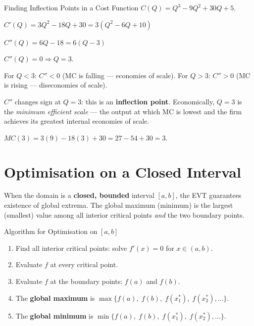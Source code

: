 \documentclass[12pt, a4paper]{article}
\theoremstyle{definition}
\begin{document}
\begin{exbox}{Finding Inflection Points in a Cost Function}
$C(Q) = Q^3 - 9Q^2 + 30Q + 5$.

$C'(Q) = 3Q^2 - 18Q + 30 = 3(Q^2-6Q+10)$

$C''(Q) = 6Q - 18 = 6(Q-3)$

$C''(Q) = 0 \Rightarrow Q = 3$.

For $Q < 3$: $C''<0$ (MC is falling --- economies of scale).
For $Q > 3$: $C''>0$ (MC is rising --- diseconomies of scale).

$C''$ changes sign at $Q=3$: this is an \textbf{inflection point}.
Economically, $Q=3$ is the \emph{minimum efficient scale} --- the output
at which MC is lowest and the firm achieves its greatest internal economies
of scale.

$MC(3) = 3(9)-18(3)+30 = 27-54+30 = 3$.
\end{exbox}

\section{Optimisation on a Closed Interval}

When the domain is a \textbf{closed, bounded} interval $[a,b]$, the EVT
guarantees existence of global extrema.  The global maximum (minimum) is the
largest (smallest) value among all interior critical points \emph{and} the
two boundary points.

\begin{keybox}{Algorithm for Optimisation on $[a,b]$}
\begin{enumerate}
  \item Find all interior critical points: solve $f'(x)=0$ for $x \in (a,b)$.
  \item Evaluate $f$ at every critical point.
  \item Evaluate $f$ at the boundary points: $f(a)$ and $f(b)$.
  \item The \textbf{global maximum} is $\max\{f(a),\;f(b),\;f(x_1^*),\;f(x_2^*),\ldots\}$.
  \item The \textbf{global minimum} is $\min\{f(a),\;f(b),\;f(x_1^*),\;f(x_2^*),\ldots\}$.
\end{enumerate}
\end{keybox}
\end{document}
